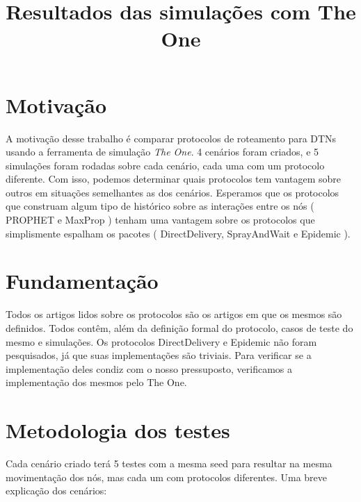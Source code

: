 \documentclass[conference]{IEEEtran}
\begin{document}
\title{Resultados das simulações com The One}

\author{
\and
{}
\and
{}
}

\IEEEpeerreviewmaketitle

\section{Motivação}
  A motivação desse trabalho é comparar protocolos de roteamento para DTNs usando a ferramenta de simulação
\textit{The One}. 4 cenários foram criados, e 5 simulações foram rodadas sobre cada cenário, cada uma com
um protocolo diferente. Com isso, podemos determinar quais protocolos tem vantagem sobre outros em situações
semelhantes as dos cenários.
  Esperamos que os protocolos que construam algum tipo de histórico sobre as interações entre os nós ( PROPHET e MaxProp ) tenham uma 
vantagem sobre os protocolos que simplismente espalham os pacotes ( DirectDelivery, SprayAndWait e Epidemic ). 

\section{Fundamentação}
  Todos os artigos lidos sobre os protocolos são os artigos em que os mesmos são definidos. Todos contêm, além da definição formal do
protocolo, casos de teste do mesmo e simulações. Os protocolos DirectDelivery e Epidemic não foram pesquisados, já que suas implementações
são triviais. Para verificar se a implementação deles condiz com o nosso pressuposto, verificamos a implementação dos mesmos pelo The One.

\section{Metodologia dos testes}
  Cada cenário criado terá 5 testes com a mesma seed para resultar na mesma movimentação dos nós, mas cada um com protocolos diferentes.
Uma breve explicação dos cenários:
\end{document}
